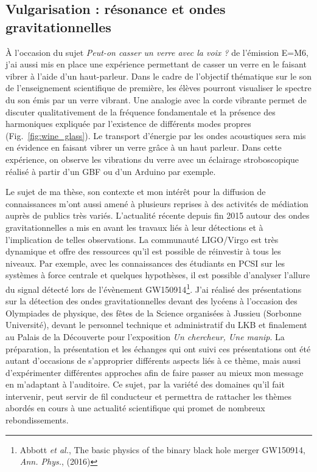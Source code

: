 \documentclass[12pt,a4paper]{article}
\begin{document}
\subsection{Vulgarisation : résonance et ondes gravitationnelles}

À l'occasion du sujet \textit{Peut-on casser un verre avec la voix ?} de l'émission E=M6, j'ai aussi mis en place une expérience permettant de casser un verre en le faisant vibrer à l'aide d'un haut-parleur.
Dans le cadre de l'objectif thématique sur le son de l'enseignement scientifique de première, les élèves pourront visualiser le spectre du son émis par un verre vibrant.
Une analogie avec la corde vibrante permet de discuter qualitativement de la fréquence fondamentale et la présence des harmoniques expliquée par l'existence de différents modes propres (Fig.~\ref{fig:wine_glass}).
Le transport d'énergie par les ondes acoustiques sera mis en évidence en faisant vibrer un verre grâce à un haut parleur.
Dans cette expérience, on observe les vibrations du verre avec un éclairage stroboscopique réalisé à partir d'un GBF ou d'un Arduino par exemple.

Le sujet de ma thèse, son contexte et mon intérêt pour la diffusion de connaissances m'ont aussi amené à plusieurs reprises à des activités de médiation auprès de publics très variés.
L'actualité récente depuis fin 2015 autour des ondes gravitationnelles a mis en avant les travaux liés à leur détections et à l'implication de telles observations.
La communauté LIGO/Virgo est très dynamique et offre des ressources qu'il est possible de réinvestir à tous les niveaux.
Par exemple, avec les connaissances des étudiants en PCSI sur les systèmes à force centrale et quelques hypothèses, il est possible d'analyser l'allure du signal détecté lors de l'évènement GW150914\footnote{Abbott \textit{et al.}, The basic physics of the binary black hole merger GW150914, \textit{Ann. Phys.}, (2016)}.
J'ai réalisé des présentations sur la détection des ondes gravitationnelles devant des lycéens à l'occasion des Olympiades de physique, des fêtes de la Science organisées à Jussieu (Sorbonne Université), devant le personnel technique et administratif du LKB et finalement au Palais de la Découverte pour l'exposition \textit{Un chercheur, Une manip}.
La préparation, la présentation et les échanges qui ont suivi ces présentations ont été autant d'occasions de s'approprier différents aspects liés à ce thème, mais aussi d'expérimenter différentes approches afin de faire passer au mieux mon message en m'adaptant à l'auditoire.
Ce sujet, par la variété des domaines qu'il fait intervenir, peut servir de fil conducteur et permettra de rattacher les thèmes abordés en cours à une actualité scientifique qui promet de nombreux rebondissements.
\end{document}
